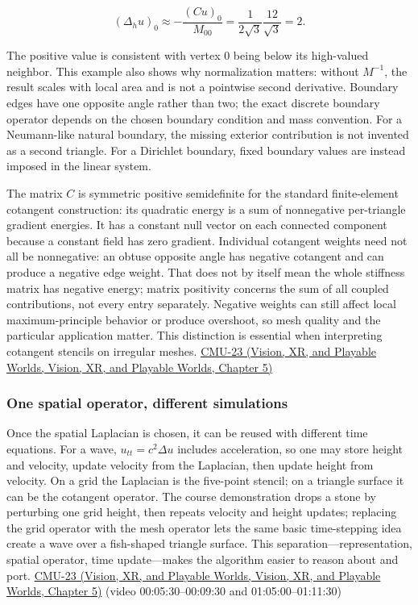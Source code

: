 \[
(\Delta_hu)_0\approx-\frac{(Cu)_0}{M_{00}}
=\frac{1}{2\sqrt3}\frac{12}{\sqrt3}=2.
\]

The positive value is consistent with vertex 0 being below its high-valued neighbor. This example also shows why normalization matters: without \(M^{-1}\), the result scales with local area and is not a pointwise second derivative. Boundary edges have one opposite angle rather than two; the exact discrete boundary operator depends on the chosen boundary condition and mass convention. For a Neumann-like natural boundary, the missing exterior contribution is not invented as a second triangle. For a Dirichlet boundary, fixed boundary values are instead imposed in the linear system.

The matrix \(C\) is symmetric positive semidefinite for the standard finite-element cotangent construction: its quadratic energy is a sum of nonnegative per-triangle gradient energies. It has a constant null vector on each connected component because a constant field has zero gradient. Individual cotangent weights need not all be nonnegative: an obtuse opposite angle has negative cotangent and can produce a negative edge weight. That does not by itself mean the whole stiffness matrix has negative energy; matrix positivity concerns the sum of all coupled contributions, not every entry separately. Negative weights can still affect local maximum-principle behavior or produce overshoot, so mesh quality and the particular application matter. This distinction is essential when interpreting cotangent stencils on irregular meshes. \href{../07-Vision-XR-and-Playable-Worlds/main.pdf\#nameddest=04-visual-computing-ii-ch036-cmu-23---physically-based-animation-and-pdes}{CMU-23 (Vision, XR, and Playable Worlds, Vision, XR, and Playable Worlds, Chapter 5)}

\subsubsection{One spatial operator, different simulations}\label{04-visual-computing-ii-ch030-one-spatial-operator-different-simulations}

Once the spatial Laplacian is chosen, it can be reused with different time equations. For a wave, \(u_{tt}=c^2\Delta u\) includes acceleration, so one may store height and velocity, update velocity from the Laplacian, then update height from velocity. On a grid the Laplacian is the five-point stencil; on a triangle surface it can be the cotangent operator. The course demonstration drops a stone by perturbing one grid height, then repeats velocity and height updates; replacing the grid operator with the mesh operator lets the same basic time-stepping idea create a wave over a fish-shaped triangle surface. This separation---representation, spatial operator, time update---makes the algorithm easier to reason about and port. \href{../07-Vision-XR-and-Playable-Worlds/main.pdf\#nameddest=04-visual-computing-ii-ch036-cmu-23---physically-based-animation-and-pdes}{CMU-23 (Vision, XR, and Playable Worlds, Vision, XR, and Playable Worlds, Chapter 5)} (video 00:05:30--00:09:30 and 01:05:00--01:11:30)

